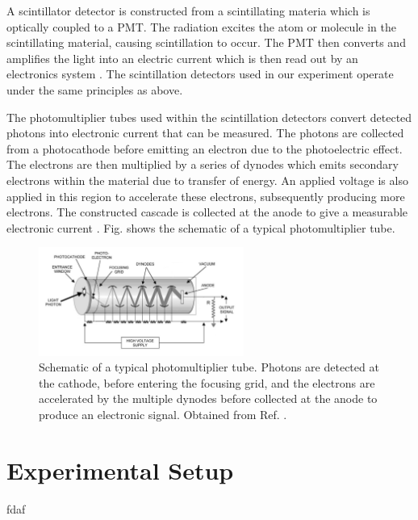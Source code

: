 \documentclass[a4paper]{report}
\numberwithin{equation}{section}
\begin{document}
A scintillator detector is constructed from a scintillating materia which is optically coupled to a PMT. The radiation excites the 
atom or molecule in the scintillating material, causing scintillation to occur. The PMT then converts and amplifies the light into 
an electric current which is then read out by an electronics system \cite{Leo1994}. The scintillation detectors used in our experiment 
operate under the same principles as above. \par 


The photomultiplier tubes used within the scintillation detectors convert detected photons into electronic current that can 
be measured. The photons are collected from a photocathode before emitting an electron due to the photoelectric effect. The electrons 
are then multiplied by a series of dynodes which emits secondary electrons within the material due to transfer of energy. An applied 
voltage is also applied in this region to accelerate these electrons, subsequently producing more electrons. The constructed cascade is 
collected at the anode to give a measurable electronic current \cite{Leo1994}. Fig. shows the schematic of a typical photomultiplier tube. 


\begin{figure}[!h]
	\centering
	\includegraphics[width=0.6\textwidth]{pmt_schematic.png}
	\caption{Schematic of a typical photomultiplier tube. Photons are detected at the cathode, before entering the focusing grid,
	 and the electrons are accelerated by the multiple dynodes before collected at the anode to produce an electronic signal.
	 Obtained from Ref. \cite{Danisch2014}.}
	\label{fig:pmt_schematic}	
\end{figure}


\chapter{Experimental Setup} \label{chap:exp_setup}

fdaf


\printbibliography
\end{document}
